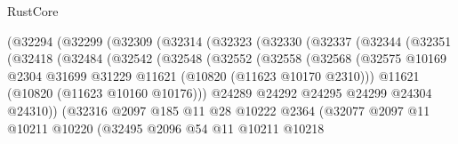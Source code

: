 \begin{lexlean}{RustCore}
\begin{coremodule}
                    (@32294
                      (@32299
                        (@32309
                          (@32314
                            (@32323
                              (@32330
                                (@32337
                                  (@32344
                                    (@32351
                                      (@32418
                                        (@32484
                                          (@32542
                                            (@32548
                                              (@32552
                                                (@32558
                                                  (@32568
                                                    (@32575
                                                      @10169
                                                      @2304
                                                      @31699
                                                      @31229
                                                      @11621
                                                      (@10820 (@11623 @10170 @2310)))
                                                    @11621
                                                    (@10820 (@11623 @10160 @10176)))
                                                  @24289
                                                  @24292
                                                  @24295
                                                  @24299
                                                  @24304
                                                  @24310))
                                              (@32316
                                                @2097
                                                @185
                                                @11
                                                @28
                                                @10222
                                                @2364
                                                (@32077
                                                  @2097
                                                  @11
                                                  @10211
                                                  @10220
                                                  (@32495
                                                    @2096
                                                    @54
                                                    @11
                                                    @10211
                                                    @10218

\end{coremodule}
\end{lexlean}
